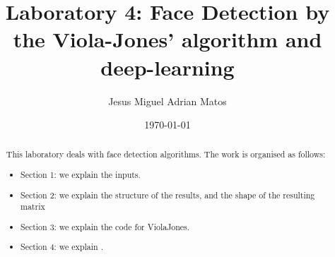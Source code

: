 \documentclass[]{article}
\title{Laboratory 4: Face Detection by the Viola-Jones' algorithm and deep-learning}
\author{Jesus Miguel Adrian Matos}
\date{\today}
\begin{document}
	\maketitle
	
	\begin{abstract}
		\noindent This laboratory deals with face detection algorithms. 		
\noindent The work is organised as follows:
\begin{itemize}
\item Section 1: we explain the inputs.
\item Section 2: we explain the structure of the results, and the shape of the resulting matrix
\item Section 3: we explain the code for ViolaJones.
\item Section 4: we explain .
\end{itemize}
		
		
		
	\end{abstract}
	
	
	
	
	
	
		
\end{document}
